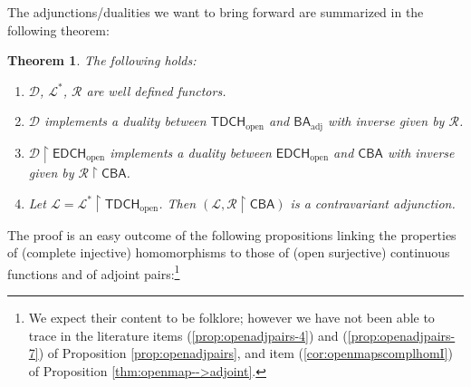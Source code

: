 \documentclass[11pt]{amsart}
\theoremstyle{plain}
\newtheorem{theorem}{Theorem}[section]
\theoremstyle{definition}
\theoremstyle{plain}
\theoremstyle{remark}
\newcommand{\bool}[1]{\mathsf{#1}}
\newcommand{\0}{\mathsf{0}}
\renewcommand{\1}{\mathsf{1}}
\renewcommand{\2}{\mathsf{2}}
\theoremstyle{definition}
\begin{document}
The adjunctions/dualities we want to bring forward are summarized in the following theorem:

\begin{theorem}\label{thm:adj-dual-cbaTDCH}
The following holds:
\begin{enumerate}
\item
$\mathcal{D}$, $\mathcal{L}^*$, $\mathcal{R}$ are well defined functors.
\item
$\mathcal{D}$ implements a duality between $\bool{TDCH}_{\mathrm{open}}$ and 
$\bool{BA}_{\mathrm{adj}}$ with inverse given by $\mathcal{R}$.
\item
$\mathcal{D}\restriction\bool{EDCH}_{\mathrm{open}}$ implements a duality between $\bool{EDCH}_{\mathrm{open}}$ and 
$\bool{CBA}$ with inverse given by $\mathcal{R}\restriction\bool{CBA}$.
\item
Let
$\mathcal{L}=\mathcal{L}^*\restriction  \bool{TDCH}_{\mathrm{open}}$.
Then $(\mathcal{L},\mathcal{R}\restriction\bool{CBA})$ is a contravariant adjunction.
\end{enumerate}
\end{theorem}


The proof is an easy outcome of the following 
propositions linking the properties of (complete injective) homomorphisms to those of 
(open surjective) continuous functions and of adjoint pairs:\footnote{We expect their content to be folklore; however we have not been able to trace in the literature items  (\ref{prop:openadjpairs-4})  and (\ref{prop:openadjpairs-7}) of Proposition \ref{prop:openadjpairs}, and item (\ref{cor:openmapscomplhomI}) of Proposition \ref{thm:openmap-->adjoint}.}
\end{document}
